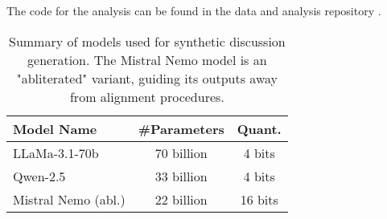 The code for the analysis can be found in the data and analysis repository \analysislink.

\begin{table}[ht]
\centering
    \begin{tabular}{|l|c|c|}
        \hline
        \textbf{Model Name} & \textbf{\#Parameters} & \textbf{Quant.} \\
        \hline
        LLaMa-3.1-70b & 70 billion & 4 bits \\
        Qwen-2.5 & 33 billion & 4 bits \\
        Mistral Nemo (abl.) & 22 billion & 16 bits\\
        \hline
    \end{tabular}
\caption{Summary of models used for synthetic discussion generation. The Mistral Nemo model is an "abliterated" variant, guiding its outputs away from alignment procedures.}
\label{tab:models}
\end{table}

